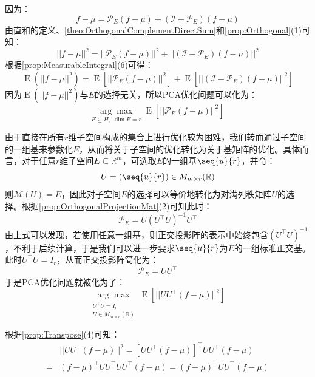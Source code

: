 因为：
\begin{equation*}
	f-\mu=\mathcal{P}_E(f-\mu)+(\mathcal{I}-\mathcal{P}_E)(f-\mu)
\end{equation*}
由直和的定义、\cref{theo:OrthogonalComplementDirectSum}和\cref{prop:Orthogonal}(1)可知：
\begin{equation*}
	||f-\mu||^2=||\mathcal{P}_E(f-\mu)||^2+||(\mathcal{I}-\mathcal{P}_E)(f-\mu)||^2
\end{equation*}
根据\cref{prop:MeasurableIntegral}(6)可得：
\begin{equation*}
	\operatorname{E}(||f-\mu||^2)=\operatorname{E}[||\mathcal{P}_E(f-\mu)||^2]+\operatorname{E}[||(\mathcal{I}-\mathcal{P}_E)(f-\mu)||^2]
\end{equation*}
因为$\operatorname{E}(||f-\mu||^2)$与$E$的选择无关，所以PCA优化问题可以化为：
\begin{equation*}
	\underset{E\subseteq H,\;\dim E=r}{\arg\max}\;\operatorname{E}[||\mathcal{P}_E(f-\mu)||^2]
\end{equation*}\par
由于直接在所有$r$维子空间构成的集合上进行优化较为困难，我们转而通过子空间的一组基来参数化$E$，从而将关于子空间的优化转化为关于基矩阵的优化。具体而言，对于任意$r$维子空间$E\subseteq\mathbb{R}^m$，可选取$E$的一组基$\seq{u}{r}$，并令：
\begin{equation*}
	U=(\seq{u}{r})\in M_{m\times r}(\mathbb{R})
\end{equation*}
则$\mathcal{M}(U)=E$，因此对子空间$E$的选择可以等价地转化为对满列秩矩阵$U$的选择。根据\cref{prop:OrthogonalProjectionMat}(2)可知此时：
\begin{equation*}
	\mathcal{P}_E=U(U^{\top}U)^{-1}U^{\top}
\end{equation*}
由上式可以发现，若使用任意一组基，则正交投影阵的表示中始终包含$(U^{\top}U)^{-1}$，不利于后续计算，于是我们可以进一步要求$\seq{u}{r}$为$E$的一组标准正交基。此时$U^{\top}U=I_r$，从而正交投影阵简化为：
\begin{equation*}
	\mathcal{P}_E=UU^{\top}
\end{equation*}
于是PCA优化问题就被化为了：
\begin{equation*}
	\underset{\substack{U^{\top}U=I_r\\U\in M_{m\times r}(\mathbb{R})}}{\arg\max}\;\operatorname{E}[||UU^{\top}(f-\mu)||^2]
\end{equation*}\par
根据\cref{prop:Transpose}(4)可知：
\begin{align*}
	&||UU^{\top}(f-\mu)||^2=[UU^{\top}(f-\mu)]^{\top}UU^{\top}(f-\mu) \\
	=&(f-\mu)^{\top}UU^{\top}UU^{\top}(f-\mu)=(f-\mu)^{\top}UU^{\top}(f-\mu)
\end{align*}
